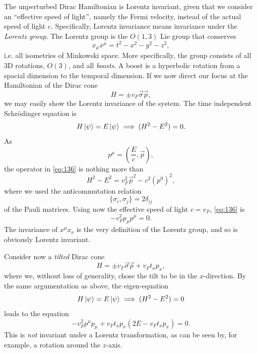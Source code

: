 The unperturbed Dirac Hamiltonian is Lorentz invariant, given that we consider an ``effective speed of light'', namely the Fermi velocity, instead of the actual speed of light \( c \).
Specifically, Lorentz invariance means invariance under the \emph{Lorentz group}.
The Lorentz group is the \( O(1,3) \) Lie group that conserves
\[
x_{\mu } x^{\mu } = t^2 - x^2 - y^2 - z^2,
\]
i.e. all isometries of Minkowski space.
More specifically, the group consists of all 3D rotations, \( O(3) \), and all \emph{boosts}.
A boost is a hyperbolic rotation from a spacial dimension to the temporal dimension.
If we now direct our focus at the Hamiltonian of the Dirac cone
\[
H = \pm v_{F} \vec{\sigma} \vec{p},
\]
we may easily show the Lorentz invariance of the system.
The time independent Schrödinger equation is
\begin{equation}
  \label{eq:136}
  H \ket{\psi } = E \ket{\psi } \implies (H^2 - E^2) = 0.
\end{equation}
As
\[
p^{\mu } = \left(\frac{E}{c}, \vec{p}\right),
\]
the operator in \cref{eq:136} is nothing more than
\begin{equation}
  \label{eq:137}
  H^2-E^2 = v_{F}^2 \vec{p}^2 - c^2 \left(p^0\right)^2 ,
\end{equation}
where we used the anticommutation relation
\[
\{\sigma_{i}, \sigma_{j}\} =  2 \delta _{ij}
\]
of the Pauli matrices.
Using now the effective speed of light \( c=v_F \), \cref{eq:136} is
\begin{equation}
  \label{eq:138}
  - v_F^2 p_{\mu } p^{\mu } = 0.
\end{equation}
The invariance of \( x^{\mu} x_{\nu} \) is the very definition of the Lorentz group, and so is obviously Lorentz invariant.

Consider now a \emph{tilted} Dirac cone
\begin{equation}
  \label{eq:139}
  H = \pm v_F \vec{\sigma} \vec{p} + v_F t_x p_x,
\end{equation}
where we, without loss of generality, chose the tilt to be in the \( x \)-direction.
By the same argumentation as above, the eigen-equation
\[
  H \ket{\psi} = E\ket{\psi} \implies (H^2 - E^2) = 0
\]
leads to the equation
\begin{equation}
  \label{eq:140}
  -v_F^2 p^{\mu} p_{\mu} + v_{F} t_{x} p_x (2 E - v_F t_x p_x) = 0.
\end{equation}
This is \emph{not} invariant under a Lorentz transformation, as can be seen by, for example, a rotation around the \( z \)-axis.

